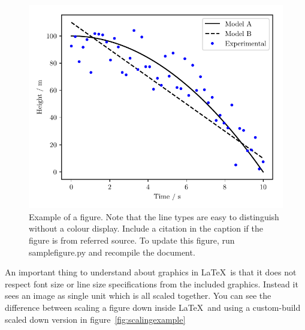 \begin{figure}[htbp]
  \centering
  \includegraphics{Figures/samplefigure.pdf}
  \caption[Short caption which will be in the table of figures]{Example of a figure.  Note that the line types are easy to
    distinguish without a colour display.  Include a citation in the caption if the figure is from referred source. To update this figure, run samplefigure.py and recompile the document.}
  \label{fig:samplefigure}
\end{figure}

An important thing to understand about graphics in \LaTeX\ is that it does
not respect font size or line size specifications from the included graphics.
Instead it sees an image as single unit which is all scaled together. You can
see the difference between scaling a figure down inside \LaTeX\ and using a
custom-build scaled down version in figure~\ref{fig:scalingexample}

